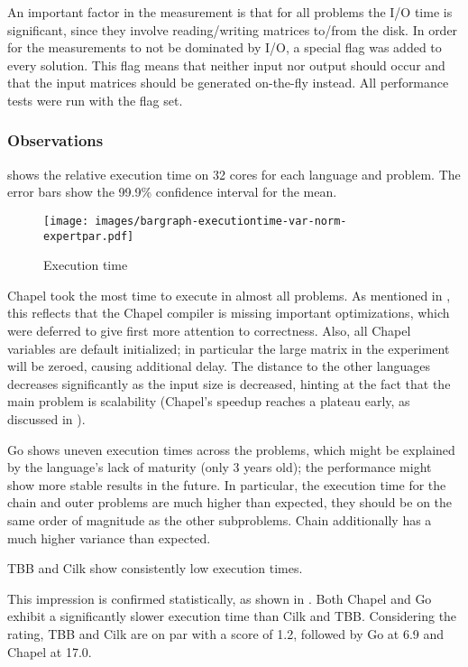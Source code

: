 An important factor in the measurement is that for all problems the I/O time is significant, since they involve reading/writing matrices to/from the disk. In order for the measurements to not be dominated by I/O, a special flag  was added to every solution. This flag means that neither input nor output should occur and that the input matrices should be generated on-the-fly instead. All performance tests were run with the  flag set.

\subsubsection{Observations}  shows the relative execution time on 32 cores for each language and problem. The error bars show the 99.9\% confidence interval for the mean.

\begin{figure}[ht]
  \centering
  \texttt{[image: images/bargraph-executiontime-var-norm-expertpar.pdf]}
  \caption{Execution time}
  \label{fig:exec:time}
\end{figure}

Chapel took the most time to execute in almost all problems. As mentioned in , this reflects that the Chapel compiler is missing important optimizations, which were deferred to give first more attention to correctness. Also, all Chapel variables are default initialized; in particular the large matrix in the experiment will be zeroed, causing additional delay.  The distance to the other languages decreases significantly as the input size is decreased, hinting at the fact that the main problem is scalability (Chapel's speedup reaches a plateau early, as discussed in ).

Go shows uneven execution times across the problems, which might be explained by the language's lack of maturity (only 3 years old); the performance might show more stable results in the future. 
In particular, the execution time for the chain and outer problems are 
much higher than expected, 
they should be on the same order of magnitude as the other subproblems.
Chain additionally has a much higher variance than expected.

TBB and Cilk show consistently low execution times.

This impression is confirmed statistically, as shown in . Both Chapel and Go exhibit a significantly slower execution time than Cilk and TBB. Considering the rating, TBB and Cilk are on par with a score of 1.2, followed by Go at 6.9 and Chapel at 17.0.

